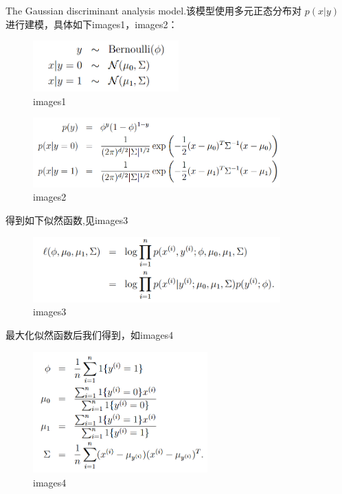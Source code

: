 \documentclass[12pt, a4paper, oneside]{ctexbook}
\begin{document}
The Gaussian discriminant analysis model.该模型使用多元正态分布对 $p(x|y)$ 进行建模，具体如下images1，images2：

  \begin{figure}[h]
		\centering 
		\includegraphics[width=0.5\textwidth]{images32.png} 
		\caption{images1}
	\end{figure}

  \begin{figure}[h]
		\centering 
		\includegraphics[width=0.85\textwidth]{images33.png} 
		\caption{images2}
	\end{figure}

得到如下似然函数,见images3

  \begin{figure}[h]
		\centering 
		\includegraphics[width=0.85\textwidth]{images34.png} 
\caption{images3}
	\end{figure}

最大化似然函数后我们得到，如images4

  \begin{figure}[h]
		\centering 
		\includegraphics[width=0.6\textwidth]{images36.png} 
\caption{images4}
	\end{figure}
\end{document}
